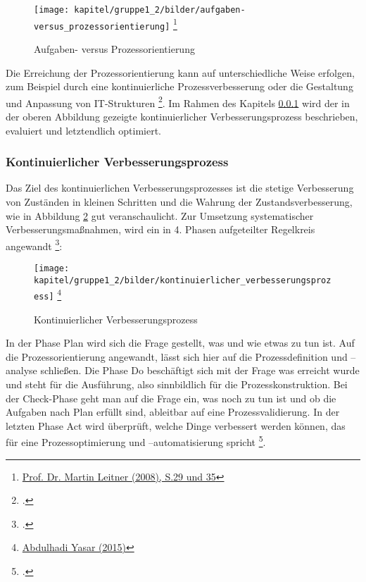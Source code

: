 \begin{figure}[h!]
	\centering
	\texttt{[image: kapitel/gruppe1\_2/bilder/aufgaben-versus\_prozessorientierung]} 
	\footnote{\url{Prof. Dr. Martin Leitner (2008), S.29 und 35}}
	\caption{Aufgaben- versus Prozessorientierung}
	\label{fig_aufgaben_vs_prozess}
\end{figure}


Die Erreichung der Prozessorientierung kann auf unterschiedliche Weise erfolgen, zum Beispiel durch eine kontinuierliche Prozessverbesserung oder die Gestaltung und Anpassung von IT-Strukturen \footcite{Zitat fehlt}. Im Rahmen des Kapitels \ref{subsubsection_kontinuierlicher_verbesserungsprozess}  wird der in der oberen Abbildung gezeigte kontinuierlicher Verbesserungsprozess beschrieben, evaluiert und letztendlich optimiert.



\subsubsection{Kontinuierlicher Verbesserungsprozess}
\label{subsubsection_kontinuierlicher_verbesserungsprozess}
Das Ziel des kontinuierlichen Verbesserungsprozesses ist die stetige Verbesserung von Zuständen in kleinen Schritten und die Wahrung der  Zustandsverbesserung, wie in Abbildung \ref{fig_kontinuierliche_verbesserung} gut veranschaulicht. Zur Umsetzung systematischer Verbesserungsmaßnahmen, wird ein in 4. Phasen aufgeteilter Regelkreis angewandt \footcite{Zitat fehlt}:
 
\begin{figure}[h!]
	\centering
	\texttt{[image: kapitel/gruppe1\_2/bilder/kontinuierlicher\_verbesserungsprozess]} 
	\footnote{\url{Abdulhadi Yasar (2015)}}
	\caption{Kontinuierlicher Verbesserungsprozess}
	\label{fig_kontinuierliche_verbesserung}
\end{figure}


In der Phase Plan wird sich die Frage gestellt, was und wie etwas zu tun ist. Auf die Prozessorientierung angewandt, lässt sich hier auf die Prozessdefinition und –analyse schließen. Die Phase Do beschäftigt sich mit der Frage was erreicht wurde und steht für die Ausführung, also sinnbildlich für die Prozesskonstruktion. Bei der Check-Phase geht man auf die Frage ein, was noch zu tun ist und ob die Aufgaben nach Plan erfüllt sind, ableitbar auf eine Prozessvalidierung. In der letzten Phase Act wird überprüft, welche Dinge verbessert werden können, das für eine Prozessoptimierung und –automatisierung spricht \footcite{Zitat fehlt}.



